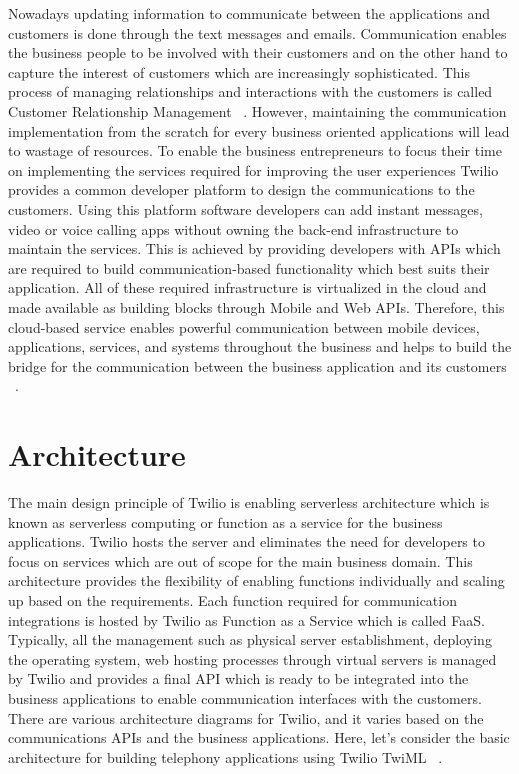 Nowadays updating information to communicate between the applications and 
customers is done through the text messages and emails. Communication enables 
the business people to be involved with their customers and on the other hand
to capture the interest of customers which are increasingly sophisticated. 
This process of managing relationships and interactions with the 
customers is called Customer Relationship Management
~\cite{hid-sp18-406-twilio-intro1}. However, maintaining the communication 
implementation from the scratch for every business oriented applications will 
lead to wastage of resources. To enable the business entrepreneurs to focus 
their time on implementing the services required for improving the user 
experiences Twilio provides a common developer platform to design the 
communications to the customers. Using this platform software developers can add
instant messages, video or voice calling apps without owning the 
back-end infrastructure to maintain the services. This is achieved by providing
developers with APIs which are required to build communication-based 
functionality which best suits their application.  All of these required 
infrastructure is virtualized in the cloud and made available as building 
blocks through Mobile and Web APIs. Therefore, this cloud-based service enables
powerful communication between mobile devices, applications, services, and 
systems throughout the business and helps to build the bridge for the 
communication between the business application and its customers
~\cite{hid-sp18-406-twilio-intro2}. 

\section{Architecture}

The main design principle of Twilio is enabling serverless architecture which is
known as serverless computing or function as a service for the business 
applications. Twilio hosts the server and eliminates the need for developers to 
focus on services which are out of scope for the main business domain. This 
architecture provides the flexibility of enabling functions individually and 
scaling up based on the requirements. Each function required for communication 
integrations is hosted by Twilio as Function as a Service which is called FaaS. 
Typically, all the management such as physical server establishment, deploying 
the operating system, web hosting processes through virtual servers is managed 
by Twilio and provides a final API which is ready to be integrated into the 
business applications to enable communication interfaces with the customers. 
There are various architecture diagrams for Twilio, and it varies based on the 
communications APIs and the business applications. Here, let's consider the 
basic architecture for building telephony applications using Twilio TwiML
~\cite{hid-sp18-406-twilio-architecture1}.

